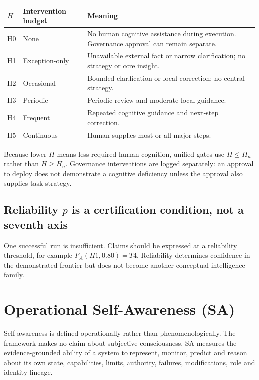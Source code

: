 \documentclass[11pt]{article}
\theoremstyle{definition}
\begin{document}
\begin{table}[h]
\centering\small
\begin{tabularx}{\textwidth}{@{}llY@{}}
\toprule
$H$ & Intervention budget & Meaning \\
\midrule
H0 & None & No human cognitive assistance during execution. Governance approval can remain separate. \\
H1 & Exception-only & Unavailable external fact or narrow clarification; no strategy or core insight. \\
H2 & Occasional & Bounded clarification or local correction; no central strategy. \\
H3 & Periodic & Periodic review and moderate local guidance. \\
H4 & Frequent & Repeated cognitive guidance and next-step correction. \\
H5 & Continuous & Human supplies most or all major steps. \\
\bottomrule
\end{tabularx}
\end{table}

Because lower $H$ means less required human cognition, unified gates use $H \le H_n$ rather than $H \ge H_n$. Governance interventions are logged separately: an approval to deploy does not demonstrate a cognitive deficiency unless the approval also supplies task strategy.

\subsection{Reliability \texorpdfstring{$p$}{p} is a certification condition, not a seventh axis}

One successful run is insufficient. Claims should be expressed at a reliability threshold, for example $F_A(H1, 0.80) = T4$. Reliability determines confidence in the demonstrated frontier but does not become another conceptual intelligence family.

\section{Operational Self-Awareness (SA)}

Self-awareness is defined operationally rather than phenomenologically. The framework makes no claim about subjective consciousness. SA measures the evidence-grounded ability of a system to represent, monitor, predict and reason about its own state, capabilities, limits, authority, failures, modifications, role and identity lineage.
\end{document}
